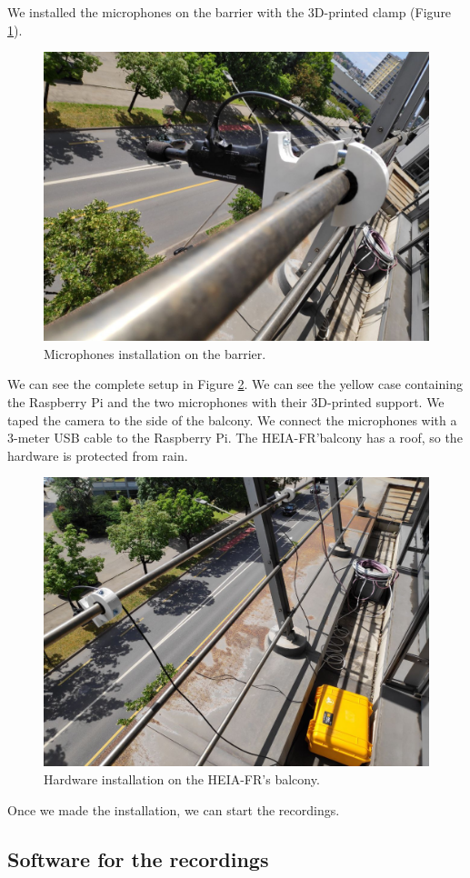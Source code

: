 
We installed the microphones on the barrier with the 3D-printed clamp (Figure \ref{fig:microphones_support_installation}).

\begin{figure}[H]
    \centering
    \includegraphics[width=.5\textwidth]{images/microphones_support_installation.jpg}
    \caption{Microphones installation on the barrier.}
    \label{fig:microphones_support_installation}
\end{figure}

We can see the complete setup in Figure \ref{fig:global_installation}. We can see the yellow case containing the Raspberry Pi and the two microphones with their 3D-printed support. We taped the camera to the side of the balcony. We connect the microphones with a 3-meter USB cable to the Raspberry Pi. The HEIA-FR'balcony has a roof, so the hardware is protected from rain.

\begin{figure}[H]
    \centering
    \includegraphics[width=.5\textwidth]{images/global_installation.jpg}
    \caption{Hardware installation on the HEIA-FR's balcony.}
    \label{fig:global_installation}
\end{figure}

Once we made the installation, we can start the recordings.

\subsection{Software for the recordings}

